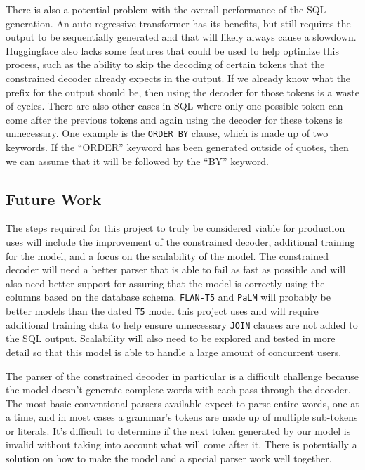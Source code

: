 \documentclass[11pt]{article}
\begin{document}
There is also a potential problem with the overall performance of the SQL generation. An auto-regressive transformer has its benefits, but still requires the output to be sequentially generated and that will likely always cause a slowdown. Huggingface \cite{wolf2020huggingfaces} also lacks some features that could be used to help optimize this process, such as the ability to skip the decoding of certain tokens that the constrained decoder already expects in the output. If we already know what the prefix for the output should be, then using the decoder for those tokens is a waste of cycles. There are also other cases in SQL where only one possible token can come after the previous tokens and again using the decoder for these tokens is unnecessary. One example is the \texttt{ORDER BY} clause, which is made up of two keywords. If the ``ORDER'' keyword has been generated outside of quotes, then we can assume that it will be followed by the ``BY'' keyword.

\subsection{Future Work}

The steps required for this project to truly be considered viable for production uses will include the improvement of the constrained decoder, additional training for the model, and a focus on the scalability of the model. The constrained decoder will need a better parser that is able to fail as fast as possible and will also need better support for assuring that the model is correctly using the columns based on the database schema. \texttt{FLAN-T5} \citep{chung2022scaling} and \texttt{PaLM} \citep{chowdhery2022palm} will probably be better models than the dated \texttt{T5} model this project uses and will require additional training data to help ensure unnecessary \texttt{JOIN} clauses are not added to the SQL output. Scalability will also need to be explored and tested in more detail so that this model is able to handle a large amount of concurrent users.

The parser of the constrained decoder in particular is a difficult challenge because the model doesn't generate complete words with each pass through the decoder. The most basic conventional parsers available expect to parse entire words, one at a time, and in most cases a grammar's tokens are made up of multiple sub-tokens or literals. It's difficult to determine if the next token generated by our model is invalid without taking into account what will come after it. There is potentially a solution on how to make the model and a special parser work well together.
\end{document}
